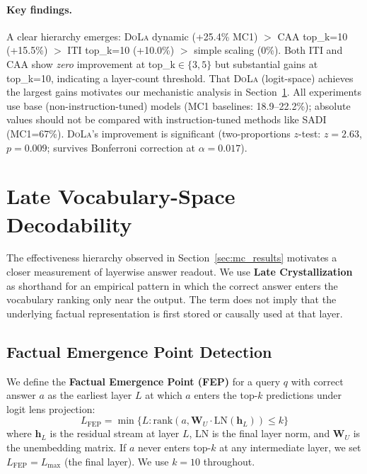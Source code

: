\documentclass[11pt]{article}
\newcommand{\iti}{\textsc{ITI}}
\newcommand{\dola}{\textsc{DoLa}}
\newcommand{\caa}{\textsc{CAA}}
\begin{document}
\paragraph{Key findings.} A clear hierarchy emerges: \dola{} dynamic (+25.4\% MC1) $>$ \caa{} top\_k=10 (+15.5\%) $>$ \iti{} top\_k=10 (+10.0\%) $>$ simple scaling (0\%). Both \iti{} and \caa{} show \emph{zero} improvement at top\_k$\in\{3,5\}$ but substantial gains at top\_k=10, indicating a layer-count threshold. That \dola{} (logit-space) achieves the largest gains motivates our mechanistic analysis in Section~\ref{sec:crystallization}. All experiments use base (non-instruction-tuned) models (MC1 baselines: 18.9--22.2\%); absolute values should not be compared with instruction-tuned methods like SADI \citep{zhang2025sadi} (MC1=67\%). \dola{}'s improvement is significant (two-proportions $z$-test: $z{=}2.63$, $p{=}0.009$; survives Bonferroni correction at $\alpha{=}0.017$).

\section{Late Vocabulary-Space Decodability}
\label{sec:crystallization}

The effectiveness hierarchy observed in Section~\ref{sec:mc_results} motivates a closer measurement of layerwise answer readout. We use \textbf{Late Crystallization} as shorthand for an empirical pattern in which the correct answer enters the vocabulary ranking only near the output. The term does not imply that the underlying factual representation is first stored or causally used at that layer.

\subsection{Factual Emergence Point Detection}
\label{sec:fep}

We define the \textbf{Factual Emergence Point (FEP)} for a query $q$ with correct answer $a$ as the earliest layer $L$ at which $a$ enters the top-$k$ predictions under logit lens projection:
\begin{equation}
    L_{\text{FEP}} = \min\{L : \text{rank}(a, \mathbf{W}_U \cdot \text{LN}(\mathbf{h}_L)) \leq k\}
\end{equation}
where $\mathbf{h}_L$ is the residual stream at layer $L$, LN is the final layer norm, and $\mathbf{W}_U$ is the unembedding matrix. If $a$ never enters top-$k$ at any intermediate layer, we set $L_{\text{FEP}} = L_{\max}$ (the final layer). We use $k=10$ throughout.
\end{document}
